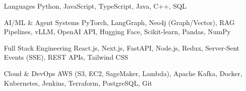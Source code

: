 

\begin{cvskills}

  \cvskill
    {Languages}
    {Python, JavaScript, TypeScript, Java, C++, SQL}

  \cvskill
    {AI/ML \& Agent Systems}
    {PyTorch, LangGraph, Neo4j (Graph/Vector), RAG Pipelines, vLLM, OpenAI API, Hugging Face, Scikit-learn, Pandas, NumPy}

  \cvskill
    {Full Stack Engineering}
    {React.js, Next.js, FastAPI, Node.js, Redux, Server-Sent Events (SSE), REST APIs, Tailwind CSS}

  \cvskill
    {Cloud \& DevOps}
    {AWS (S3, EC2, SageMaker, Lambda), Apache Kafka, Docker, Kubernetes, Jenkins, Terraform, PostgreSQL, Git}

\end{cvskills}

